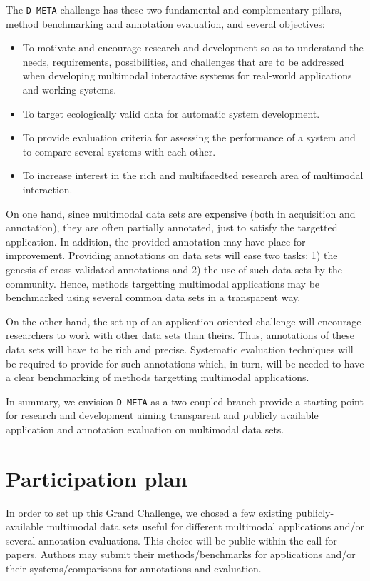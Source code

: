 \documentclass{sig-alternate}
\begin{document}
The \texttt{D-META} challenge has these two fundamental and complementary pillars, method benchmarking and
annotation evaluation, and several objectives:
\begin{itemize}
\item To motivate and encourage research and development so as to understand the needs, requirements, possibilities, and
challenges that are to be addressed when developing multimodal interactive systems for real-world applications and
working systems.
\item To target ecologically valid data for automatic system development.
\item To provide evaluation criteria for assessing the performance of a system and to compare several systems with each
other.
\item To increase interest in the rich and multifacedted research area of multimodal interaction.
\end{itemize}

On one hand, since multimodal data sets are expensive (both in acquisition and annotation), they are often partially
annotated, just to satisfy the targetted application. In addition, the provided annotation may have place for
improvement. Providing annotations on data sets will ease two tasks: 1) the genesis of
cross-validated annotations and 2) the use of such data sets by the community. Hence, methods targetting multimodal
applications may be benchmarked using several common data sets in a transparent way.\vspace{0.3cm}

On the other hand, the set up of an application-oriented challenge will encourage researchers to work with other data
sets than theirs. Thus, annotations of these data sets will have to be rich and precise. Systematic evaluation
techniques will be required to provide for such annotations which, in turn, will be needed to have a clear
benchmarking of methods targetting multimodal applications.\vspace{0.3cm}

In summary, we envision \texttt{D-META} as a two coupled-branch provide a starting point for research and development
aiming transparent and publicly available application and annotation evaluation on multimodal data sets.

\section{Participation plan}
In order to set up this Grand Challenge, we chosed a few existing publicly-available multimodal data sets useful
for different multimodal applications and/or several annotation evaluations. This choice will be public within the call
for papers. Authors may submit their methods/benchmarks for applications and/or their systems/comparisons for
annotations and evaluation.\vspace{0.3cm}
\end{document}
